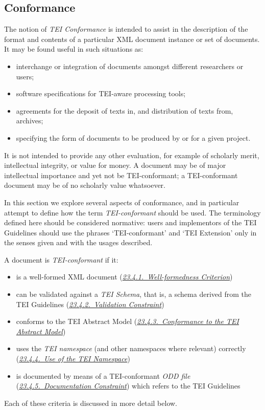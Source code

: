 \subsection[{Conformance}]{Conformance}\label{CF}\par
The notion of \textit{TEI Conformance} is intended to assist in the description of the format and contents of a particular XML document instance or set of documents. It may be found useful in such situations as: \begin{itemize}
\item interchange or integration of documents amongst different researchers or users; 
\item software specifications for TEI-aware processing tools; 
\item agreements for the deposit of texts in, and distribution of texts from, archives; 
\item specifying the form of documents to be produced by or for a given project. 
\end{itemize}  It is not intended to provide any other evaluation, for example of scholarly merit, intellectual integrity, or value for money. A document may be of major intellectual importance and yet not be TEI-conformant; a TEI-conformant document may be of no scholarly value whatsoever.\par
In this section we explore several aspects of conformance, and in particular attempt to define how the term \textit{TEI-conformant} should be used. The terminology defined here should be considered normative: users and implementors of the TEI Guidelines should use the phrases ‘TEI-conformant’ and ‘TEI Extension’ only in the senses given and with the usages described.\par
A document is \textit{TEI-conformant} if it: \begin{itemize}
\item is a well-formed XML document (\textit{\hyperref[CFWF]{23.4.1.\ Well-formedness Criterion}})
\item can be validated against a \textit{TEI Schema}, that is, a schema derived from the TEI Guidelines (\textit{\hyperref[CFVL]{23.4.2.\ Validation Constraint}})
\item conforms to the TEI Abstract Model (\textit{\hyperref[CFAM]{23.4.3.\ Conformance to the TEI Abstract Model}})
\item uses the \textit{TEI namespace} (and other namespaces where relevant) correctly (\textit{\hyperref[CFNS]{23.4.4.\ Use of the TEI Namespace}})
\item is documented by means of a TEI-conformant \textit{ODD file} (\textit{\hyperref[CFOD]{23.4.5.\ Documentation Constraint}}) which refers to the TEI Guidelines
\end{itemize}  Each of these criteria is discussed in more detail below.\par
